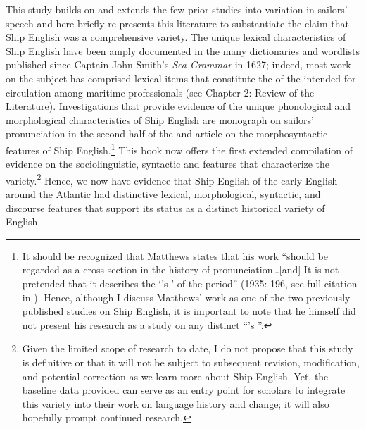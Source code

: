 This study builds on and extends the few prior studies into variation in sailors’ speech and here briefly re-presents this literature to substantiate the claim that Ship English was a comprehensive variety. The unique lexical characteristics of Ship English have been amply documented in the many dictionaries and wordlists published since Captain John Smith’s \textit{Sea Grammar} in 1627; indeed, most work on the subject has comprised lexical items that constitute the  of the  intended for circulation among maritime professionals (see Chapter 2: Review of the Literature). Investigations that provide evidence of the unique phonological and morphological characteristics of Ship English are  monograph on sailors’ pronunciation in the second half of the  and  article on the morphosyntactic features of Ship English.\footnote{It should be recognized that Matthews states that his work “should be regarded as a cross-section in the history of pronunciation…[and] It is not pretended that it describes the ‘’s ’ of the period” (1935: 196, see full citation in ). Hence, although I discuss Matthews’ work as one of the two previously published studies on Ship English, it is important to note that he himself did not present his research as a study on any distinct “’s ”.}  This book now offers the first extended compilation of evidence on the sociolinguistic, syntactic and  features that characterize the variety.\footnote{Given the limited scope of research to date, I do not propose that this study is definitive or that it will not be subject to subsequent revision, modification, and potential correction as we learn more about Ship English. Yet, the baseline data provided can serve as an entry point for scholars to integrate this variety into their work on language history and change; it will also hopefully prompt continued research.}  Hence, we now have evidence that Ship English of the early English  around the Atlantic had distinctive lexical, morphological, syntactic, and discourse features that support its status as a distinct historical variety of English. 


